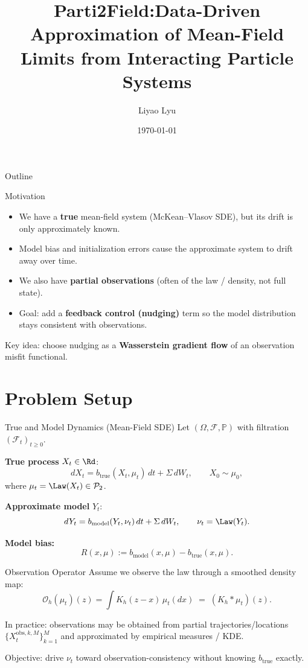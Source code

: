\documentclass[aspectratio=169]{beamer}
\title[Parti2Field]{Parti2Field:Data-Driven Approximation of Mean-Field Limits from Interacting Particle Systems}
\author[L. Lyu]{Liyao Lyu}
\institute[UCLA Mathematics]{Department of Mathematics \\ University of California, Los Angeles}
\date{\today}
\begin{document}
\begin{frame}[plain]
  \titlepage
\end{frame}

\begin{frame}{Outline}
  \tableofcontents
\end{frame}


\begin{frame}{Motivation}
\begin{itemize}
  \item We have a \textbf{true} mean-field system (McKean--Vlasov SDE), but its drift is only approximately known.
  \item Model bias and initialization errors cause the approximate system to drift away over time.
  \item We also have \textbf{partial observations} (often of the law / density, not full state).
  \item Goal: add a \textbf{feedback control (nudging)} term so the model distribution stays consistent with observations.
\end{itemize}
\vspace{0.5em}
Key idea: choose nudging as a \textbf{Wasserstein gradient flow} of an observation misfit functional.
\end{frame}

\section{Problem Setup}

\begin{frame}{True and Model Dynamics (Mean-Field SDE)}
Let $(\Omega,\mathcal{F},\mathbb{P})$ with filtration $(\mathcal{F}_t)_{t\ge 0}$.

\medskip
\textbf{True process} $X_t\in\Rd$:
\[
dX_t = b_{\text{true}}(X_t,\mu_t)\,dt + \Sigma\, dW_t,\qquad X_0\sim \mu_0,
\]
where $\mu_t=\Law(X_t)\in\mathcal{P}_2$.

\medskip
\textbf{Approximate model} $Y_t$:
\[
dY_t = b_{\text{model}}(Y_t,\nu_t)\,dt + \Sigma\, dW_t,\qquad \nu_t=\Law(Y_t).
\]

\medskip
\textbf{Model bias:}\quad
\[
R(x,\mu) := b_{\text{model}}(x,\mu)-b_{\text{true}}(x,\mu).
\]
\end{frame}

\begin{frame}{Observation Operator}
Assume we observe the law through a smoothed density map:
\[
\mathcal{O}_h(\mu_t)(z) = \int K_h(z-x)\,\mu_t(dx) \;=\; (K_h * \mu_t)(z).
\]

\medskip
In practice: observations may be obtained from partial trajectories/locations
$\{X^{\text{obs},k,M}_t\}_{k=1}^M$ and approximated by empirical measures / KDE.

\medskip
Objective: drive $\nu_t$ toward observation-consistency without knowing $b_{\text{true}}$ exactly.
\end{frame}
\end{document}
